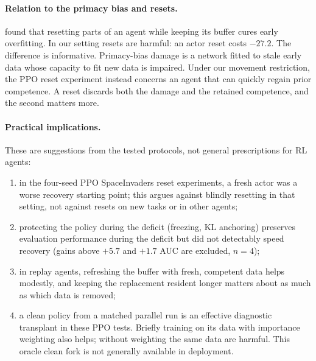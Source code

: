\documentclass[10pt]{article} %
\begin{document}
\paragraph{Relation to the primacy bias and resets.}
\citet{nikishin2022primacy} found that resetting parts of an agent while keeping its buffer cures early overfitting. In our setting resets are harmful: an actor reset costs $-27.2$. The difference is informative. Primacy-bias damage is a network fitted to stale early data whose capacity to fit new data is impaired. Under our movement restriction, the PPO reset experiment instead concerns an agent that can quickly regain prior competence. A reset discards both the damage and the retained competence, and the second matters more.

\paragraph{Practical implications.}
These are suggestions from the tested protocols, not general prescriptions for RL agents:
\begin{enumerate}[label=(\roman*)]
\item in the four-seed PPO SpaceInvaders reset experiments, a fresh actor was a worse recovery starting point; this argues against blindly resetting in that setting, not against resets on new tasks or in other agents;
\item protecting the policy during the deficit (freezing, KL anchoring) preserves evaluation performance during the deficit but did not detectably speed recovery (gains above $+5.7$ and $+1.7$ AUC are excluded, $n=4$);
\item in replay agents, refreshing the buffer with fresh, competent data helps modestly, and keeping the replacement resident longer matters about as much as which data is removed;
\item a clean policy from a matched parallel run is an effective diagnostic transplant in these PPO tests. Briefly training on its data with importance weighting also helps; without weighting the same data are harmful. This oracle clean fork is not generally available in deployment.
\end{enumerate}
\end{document}

